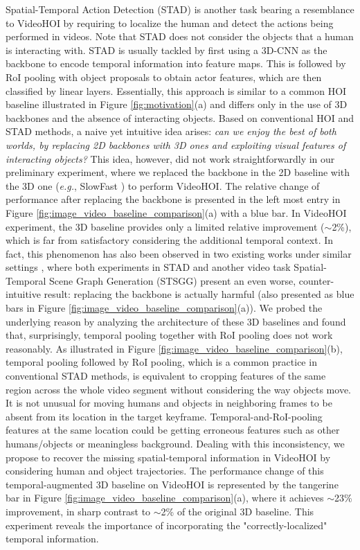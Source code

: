 \documentclass[sigconf]{acmart}
\begin{document}
Spatial-Temporal Action Detection (STAD) is another task bearing a resemblance to VideoHOI by requiring to localize the human and detect the actions being performed in videos. 
Note that STAD does not consider the objects that a human is interacting with.
STAD is usually tackled by first using a 3D-CNN \cite{tran2015learning,carreira2017quo} as the backbone to encode temporal information into feature maps.
This is followed by RoI pooling with object proposals to obtain actor features, which are then classified by linear layers. 
Essentially, this approach is similar to a common HOI baseline illustrated in Figure \ref{fig:motivation}(a) and differs only in the use of 3D backbones and the absence of interacting objects.
Based on conventional HOI and STAD methods, a naive yet intuitive idea arises: \textit{can we enjoy the best of both worlds, by replacing 2D backbones with 3D ones and exploiting visual features of interacting objects?}
This idea, however, did not work straightforwardly in our preliminary experiment, where we replaced the backbone in the 2D baseline \cite{wan2019pose} with the 3D one (\emph{e.g.}, SlowFast \cite{feichtenhofer2019slowfast}) to perform VideoHOI.
The relative change of performance after replacing the backbone is presented in the left most entry in Figure \ref{fig:image_video_baseline_comparison}(a) with a blue bar. 
In VideoHOI experiment, the 3D baseline provides only a limited relative improvement ($\sim$2\%), which is far from satisfactory considering the additional temporal context.
In fact, this phenomenon has also been observed in two existing works under similar settings \cite{gu2018ava,ji2020action}, where both experiments in STAD and another video task Spatial-Temporal Scene Graph Generation (STSGG) present an even worse, counter-intuitive result: replacing the backbone is actually harmful (also presented as blue bars in Figure \ref{fig:image_video_baseline_comparison}(a)).
We probed the underlying reason by analyzing the architecture of these 3D baselines and found that, surprisingly, temporal pooling together with RoI pooling does not work reasonably.
As illustrated in Figure \ref{fig:image_video_baseline_comparison}(b), temporal pooling followed by RoI pooling, which is a common practice in conventional STAD methods, is equivalent to cropping features of the same region across the whole video segment without considering the way objects move.
It is not unusual for moving humans and objects in neighboring frames to be absent from its location in the target keyframe. 
Temporal-and-RoI-pooling features at the same location could be getting erroneous features such as other humans/objects or meaningless background.
Dealing with this inconsistency, we propose to recover the missing spatial-temporal information in VideoHOI by considering human and object trajectories. 
The performance change of this temporal-augmented 3D baseline on VideoHOI is represented by the tangerine bar in Figure \ref{fig:image_video_baseline_comparison}(a), where it achieves $\sim$23\% improvement, in sharp contrast to $\sim$2\% of the original 3D baseline.
This experiment reveals the importance of incorporating the "correctly-localized" temporal information.
\end{document}
